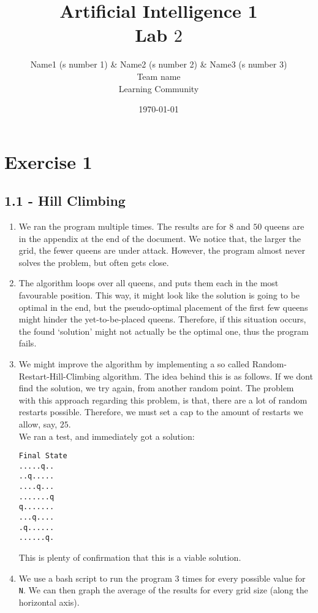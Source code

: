 \documentclass{article}
\title{{\bf Artificial Intelligence 1} \\ Lab $2$}%
\author{
Name1 (s number 1) \& Name2 (s number 2) \& Name3 (s number 3) \\ 
Team name \\
Learning Community
} %
\date{\today}%
\begin{document}
\maketitle

\section*{Exercise 1}
\subsection*{1.1 - Hill Climbing}
\begin{enumerate}[1.]
\item We ran the program multiple times. The results are for $8$ and $50$ queens are in the appendix at the end of the document. We notice that, the larger the grid, the fewer queens are under attack. However, the program almost never solves the problem, but often gets close. 
\item The algorithm loops over all queens, and puts them each in the most favourable position. This way, it might look like the solution is going to be optimal in the end, but the pseudo-optimal placement of the first few queens might hinder the yet-to-be-placed queens. Therefore, if this situation occurs, the found `solution' might not actually be the optimal one, thus the program fails.
\item We might improve the algorithm by implementing a so called Random-Restart-Hill-Climbing algorithm. The idea behind this is as follows. If we dont find the solution, we try again, from another random point. The problem with this approach regarding this problem, is that, there are a lot of random restarts possible. Therefore, we must set a cap to the amount of restarts we allow, say, $25$.\\
We ran a test, and immediately got a solution:
\begin{verbatim}
Final State
.....q..
..q.....
....q...
.......q
q.......
...q....
.q......
......q.
\end{verbatim}
This is plenty of confirmation that this is a viable solution.
\item We use a bash script to run the program 3 times for every possible value for \verb|N|. We can then graph the average of the results for every grid size (along the horizontal axis).\\

\usetikzlibrary{calc}
\begin{center}
\end{center}
\end{enumerate}
\end{document}
